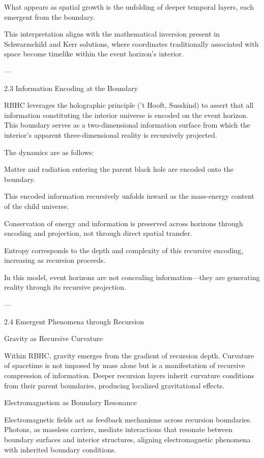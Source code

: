 \documentclass[11pt,a4paper]{article}
\begin{document}
What appears as spatial growth is the unfolding of deeper temporal layers, each emergent from the boundary.


This interpretation aligns with the mathematical inversion present in Schwarzschild and Kerr solutions, where coordinates traditionally associated with space become timelike within the event horizon’s interior.


---

2.3 Information Encoding at the Boundary

RBHC leverages the holographic principle (’t Hooft, Susskind) to assert that all information constituting the interior universe is encoded on the event horizon. This boundary serves as a two-dimensional information surface from which the interior’s apparent three-dimensional reality is recursively projected.

The dynamics are as follows:

Matter and radiation entering the parent black hole are encoded onto the boundary.

This encoded information recursively unfolds inward as the mass-energy content of the child universe.

Conservation of energy and information is preserved across horizons through encoding and projection, not through direct spatial transfer.

Entropy corresponds to the depth and complexity of this recursive encoding, increasing as recursion proceeds.


In this model, event horizons are not concealing information—they are generating reality through its recursive projection.


---

2.4 Emergent Phenomena through Recursion

Gravity as Recursive Curvature

Within RBHC, gravity emerges from the gradient of recursion depth. Curvature of spacetime is not imposed by mass alone but is a manifestation of recursive compression of information. Deeper recursion layers inherit curvature conditions from their parent boundaries, producing localized gravitational effects.

Electromagnetism as Boundary Resonance

Electromagnetic fields act as feedback mechanisms across recursion boundaries. Photons, as massless carriers, mediate interactions that resonate between boundary surfaces and interior structures, aligning electromagnetic phenomena with inherited boundary conditions.
\end{document}
